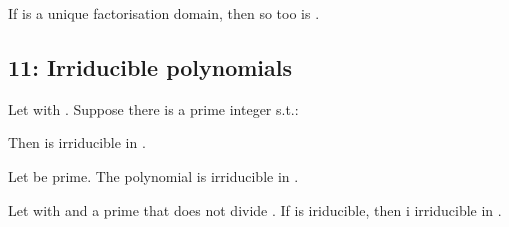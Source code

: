 \begin{Le}
\begin{T} If  is a unique factorisation domain, then so too is . \end{T}

\subsection{11: Irriducible polynomials}
\begin{T} Let  with . Suppose there is a prime integer  s.t.: 
\begin{compactitem}
\item {}
\item {}
\item {}
\end{compactitem}
Then  is irriducible in .
\end{T}

\begin{C} Let  be prime. The polynomial  is irriducible in . \end{C}

\begin{P} Let  with  and  a prime that does not divide .  If  is iriducible, then i irriducible in . \end{P}


\end{Le}
